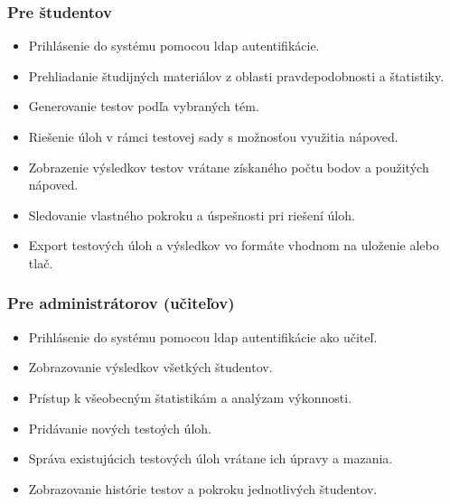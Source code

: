  \subsubsection{Pre študentov}
 \begin{itemize}
   \item Prihlásenie do systému pomocou \acrshort{ldap} autentifikácie.
   \item Prehliadanie študijných materiálov z oblasti pravdepodobnosti a štatistiky.
   \item Generovanie testov podľa vybraných tém.
   \item Riešenie úloh v rámci testovej sady s možnosťou využitia nápoved.
   \item Zobrazenie výsledkov testov vrátane získaného počtu bodov a použitých nápoved.
   \item Sledovanie vlastného pokroku a úspešnosti pri riešení úloh.
   \item Export testových úloh a výsledkov vo formáte vhodnom na uloženie alebo tlač.
 \end{itemize}
 
\subsubsection{Pre administrátorov (učiteľov)}
\begin{itemize}
  \item Prihlásenie do systému pomocou \acrshort{ldap} autentifikácie ako učiteľ.
\item Zobrazovanie výsledkov všetkých študentov.
\item Prístup k všeobecným štatistikám a analýzam výkonnosti.
\item Pridávanie nových testoých úloh.
\item Správa existujúcich testových úloh vrátane ich úpravy a mazania.
\item Zobrazovanie histórie testov a pokroku jednotlivých študentov.
  \end{itemize}

